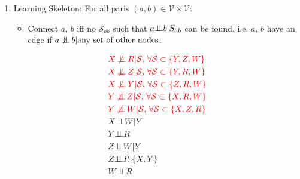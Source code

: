 \begin{enumerate}[topsep=2pt,itemsep=2pt]
    \item Learning Skeleton: For all paris $ (a,b)\in \mathcal{V}\times \mathcal{V} $:
    \begin{itemize}[topsep=2pt,itemsep=0pt]
        \item Connect $ a $, $ b $ iff no $ \mathcal{S}_{ab} $ such that $ a\bot\!\!\!\bot b|S_{ab} $ can be found. i.e. $ a,\,b $ have an edge if $ a\not\!\!\mathop{\bot\!\!\!\bot} b|\text{any set of other nodes} $.
    \end{itemize}
    \begin{center}
        \begin{minipage}{0.4\linewidth}
            \begin{align}
                &\color{red}X \not\!\!\mathop{\independent} R |\mathcal{S},\,\forall \mathcal{S}\subset\{Y,Z,W\}\\
                &\color{red}X \not\!\!\mathop{\independent} Z |\mathcal{S},\,\forall \mathcal{S}\subset\{Y,R,W\}\\
                &\color{red}X \not\!\!\mathop{\independent} Y |\mathcal{S},\,\forall \mathcal{S}\subset\{Z,R,W\}\\
                &\color{red}Y \not\!\!\mathop{\independent} Z |\mathcal{S},\,\forall \mathcal{S}\subset\{X,R,W\}\\
                &\color{red}Y \not\!\!\mathop{\independent} W |\mathcal{S},\,\forall \mathcal{S}\subset\{X,Z,R\}\\
                &X\independent W|Y\\
                &Y\independent R\\
                &Z\independent W|Y\\
                &Z\independent R|\{X,Y\}\\
                &W\independent R
            \end{align}
        \end{minipage}
\end{center}
\end{enumerate}
